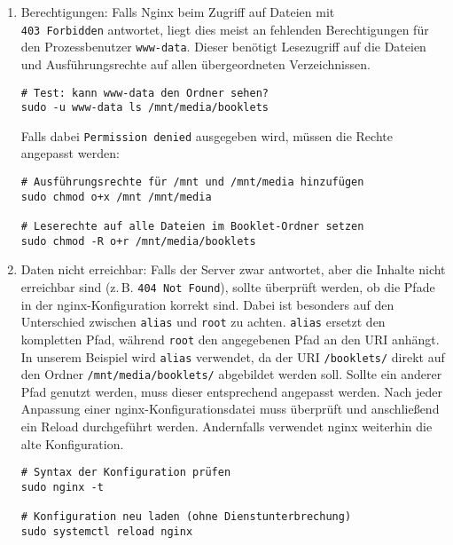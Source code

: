 \documentclass[12pt,a4paper]{report}
\begin{document}
    \begin{enumerate}
      \item Berechtigungen:
      Falls Nginx beim Zugriff auf Dateien mit\\ \texttt{403 Forbidden} antwortet, 
      liegt dies meist an fehlenden Berechtigungen für den Prozessbenutzer \texttt{www-data}.  
      Dieser benötigt Lesezugriff auf die Dateien und Ausführungsrechte auf allen übergeordneten Verzeichnissen.

      \begin{verbatim}
# Test: kann www-data den Ordner sehen?
sudo -u www-data ls /mnt/media/booklets
      \end{verbatim}

      Falls dabei \texttt{Permission denied} ausgegeben wird, müssen die Rechte angepasst werden:

      \begin{verbatim}
# Ausführungsrechte für /mnt und /mnt/media hinzufügen
sudo chmod o+x /mnt /mnt/media

# Leserechte auf alle Dateien im Booklet-Ordner setzen
sudo chmod -R o+r /mnt/media/booklets
      \end{verbatim}

      \item Daten nicht erreichbar:
      Falls der Server zwar antwortet, aber die Inhalte nicht erreichbar sind (z.\,B. \texttt{404 Not Found}), 
      sollte überprüft werden, ob die Pfade in der nginx-Konfiguration korrekt sind.  
      Dabei ist besonders auf den Unterschied zwischen \texttt{alias} und \texttt{root} zu achten.  
      \texttt{alias} ersetzt den kompletten Pfad, während \texttt{root} den angegebenen Pfad an den URI anhängt.  
      In unserem Beispiel wird \texttt{alias} verwendet, da der URI \texttt{/booklets/} direkt auf den Ordner \texttt{/mnt/media/booklets/}
      abgebildet werden soll. Sollte ein anderer Pfad genutzt werden, muss dieser entsprechend angepasst werden.
      Nach jeder Anpassung einer nginx-Konfigurationsdatei muss überprüft und anschließend ein Reload durchgeführt werden.  
      Andernfalls verwendet nginx weiterhin die alte Konfiguration.

      \begin{verbatim}
# Syntax der Konfiguration prüfen
sudo nginx -t

# Konfiguration neu laden (ohne Dienstunterbrechung)
sudo systemctl reload nginx
      \end{verbatim}


\end{enumerate}
\end{document}
